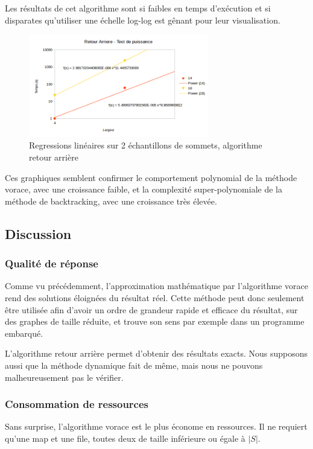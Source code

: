 \documentclass[10pt,a4paper]{article}
\begin{document}
Les résultats de cet algorithme sont si faibles en temps d'exécution et si disparates qu'utiliser une échelle log-log est gênant pour leur visualisation.

\begin{figure}[h!]
	\centering
	\includegraphics[width=0.7\textwidth]{spreadsheet/graph6}
	\caption{Regressions linéaires sur 2 échantillons de sommets, algorithme retour arrière}
\end{figure}

Ces graphiques semblent confirmer le comportement polynomial de la méthode vorace, avec une croissance faible, et la complexité super-polynomiale de la méthode de backtracking, avec une croissance très élevée.

\subsection{Discussion}

\subsubsection{Qualité de réponse}

Comme vu précédemment, l'approximation mathématique par l'algorithme vorace rend des solutions éloignées du résultat réel. Cette méthode peut donc seulement être utilisée afin d'avoir un ordre de grandeur rapide et efficace du résultat, sur des graphes de taille réduite, et trouve son sens par exemple dans un programme embarqué.

L'algorithme retour arrière permet d'obtenir des résultats exacts. Nous supposons aussi que la méthode dynamique fait de même, mais nous ne pouvons malheureusement pas le vérifier.

\subsubsection{Consommation de ressources}

Sans surprise, l'algorithme vorace est le plus économe en ressources. Il ne requiert qu'une map et une file, toutes deux de taille inférieure ou égale à $ |S| $.
\end{document}
